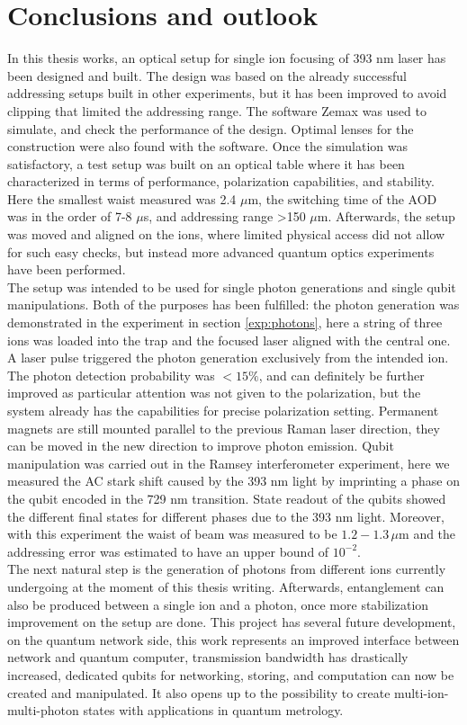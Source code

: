
\chapter{Conclusions and outlook}
In this thesis works, an optical setup for single ion focusing of 393 nm laser has been designed and built. The design was based on the already successful addressing setups built in other experiments, but it has been improved to avoid clipping that limited the addressing range. The software Zemax was used to simulate, and check the performance of the design. Optimal lenses for the construction were also found with the software. Once the simulation was satisfactory, a test setup was built on an optical table where it has been characterized in terms of performance, polarization capabilities, and stability. Here the smallest waist measured was 2.4 $\mu$m, the switching time of the AOD was in the order of 7-8 $\mu$s, and addressing range >150 $\mu$m. Afterwards, the setup was moved and aligned on the ions, where limited physical access did not allow for such easy checks, but instead more advanced quantum optics experiments have been performed.\\
The setup was intended to be used for single photon generations and single qubit manipulations. Both of the purposes has been fulfilled: the photon generation was demonstrated in the experiment in section \ref{exp:photons}, here a string of three ions was loaded into the trap and the focused laser aligned with the central one. A laser pulse triggered the photon generation exclusively from the intended ion. The photon detection probability was $<15\%$, and can definitely be further improved as particular attention was not given to the polarization, but the system already has the capabilities for precise polarization setting. Permanent magnets are still mounted parallel to the previous Raman laser direction, they can be moved in the new direction to improve photon emission.
 Qubit manipulation was carried out in the Ramsey interferometer experiment, here we measured the AC stark shift caused by the 393 nm light by imprinting a phase on the qubit encoded in the 729 nm transition. State readout of the qubits showed the different final states for different phases due to the 393 nm light. Moreover, with this experiment the waist of beam was measured to be $1.2-1.3\,\mu$m and the addressing error was estimated to have an upper bound of $10^{-2}$.\\
The next natural step is the generation of photons from different ions currently undergoing at the moment of this thesis writing. Afterwards, entanglement can also be produced between a single ion and a photon, once more stabilization improvement on the setup are done. This project has several future development, on the quantum network side, this work represents an improved interface between network and quantum computer, transmission bandwidth has drastically increased, dedicated qubits for networking, storing, and computation can now be created and manipulated. It also opens up to the possibility to create multi-ion-multi-photon states with applications in quantum metrology.
